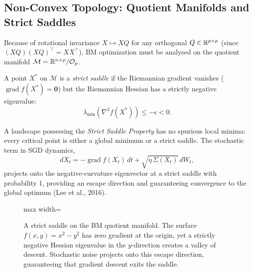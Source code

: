 \subsection{Non-Convex Topology: Quotient Manifolds and Strict Saddles}
\label{sec:nonconvex_topology}

Because of rotational invariance $X \mapsto XQ$ for any orthogonal $Q \in \mathbb{R}^{p\times p}$
(since $(XQ)(XQ)^\top = XX^\top$), BM optimization must be analysed on the quotient manifold
$\mathcal{M} = \mathbb{R}^{n \times p} / \mathcal{O}_p$.

\begin{definition}
  A point $X^*$ on $\mathcal{M}$ is a \emph{strict saddle} if the Riemannian gradient
  vanishes ($\operatorname{grad} f(X^*) = \mathbf{0}$) but the Riemannian Hessian has a
  strictly negative eigenvalue:
  \begin{equation}
    \lambda_{\min}\!\left(\nabla^2 f(X^*)\right) \leq -\epsilon < 0.
  \end{equation}
\end{definition}

A landscape possessing the \emph{Strict Saddle Property} has no spurious local minima:
every critical point is either a global minimum or a strict saddle. The stochastic term in
SGD dynamics,
\begin{equation}
  dX_t = -\operatorname{grad} f(X_t)\, dt + \sqrt{\eta\, \Sigma(X_t)}\, dW_t,
\end{equation}
projects onto the negative-curvature eigenvector at a strict saddle with probability 1,
providing an escape direction and guaranteeing convergence to the global optimum (Lee et al.,
2016).

\begin{figure}[H]
  \centering
  \begin{adjustbox}{max width=\columnwidth}
  \end{adjustbox}
  \caption{A strict saddle on the BM quotient manifold. The surface $f(x,y)=x^2-y^2$ has
  zero gradient at the origin, yet a strictly negative Hessian eigenvalue in the
  $y$-direction creates a valley of descent. Stochastic noise projects onto this escape
  direction, guaranteeing that gradient descent exits the saddle.}
  \label{fig:strict_saddle}
\end{figure}

